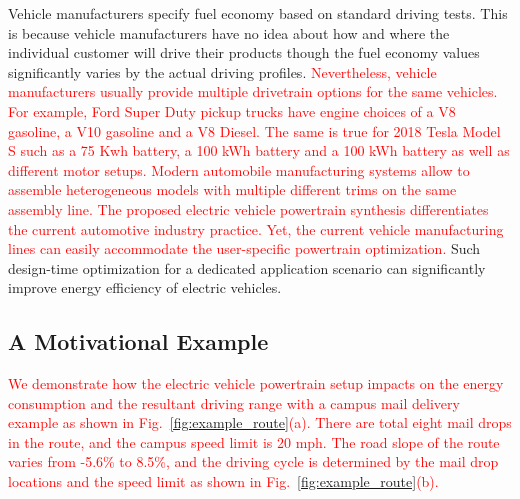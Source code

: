 \documentclass[journal]{IEEEtran}
\begin{document}
Vehicle manufacturers specify fuel economy based on standard driving tests. This is because vehicle manufacturers have no idea about how and where the individual customer will drive their products though the fuel economy values significantly varies by the actual driving profiles. \textcolor{red}{Nevertheless, vehicle manufacturers usually provide multiple drivetrain options for the same vehicles. For example, Ford Super Duty pickup trucks have engine choices of a V8 gasoline, a V10 gasoline and a V8 Diesel. The same is true for 2018 Tesla Model S such as a 75 Kwh battery, a 100 kWh battery and a 100 kWh battery as well as different motor setups. Modern automobile manufacturing systems allow to assemble heterogeneous models with multiple different trims on the same assembly line. The proposed electric vehicle powertrain synthesis differentiates the current automotive industry practice. Yet, the current vehicle manufacturing lines can easily accommodate the user-specific powertrain optimization.}
Such design-time optimization for a dedicated application scenario can significantly improve energy efficiency of electric vehicles. 


\subsection*{\textbf{A Motivational Example}}

%
\textcolor{red}{We demonstrate how the electric vehicle powertrain setup impacts on the energy consumption and the resultant driving range with a campus mail delivery example as shown in Fig.~\ref{fig:example_route}(a). 
There are total eight mail drops in the route, and the campus speed limit is 20 mph. The road slope of the route varies from -5.6\% to 8.5\%, and the driving cycle is determined by the mail drop locations and the speed limit as shown in Fig.~\ref{fig:example_route}(b).}
\end{document}
